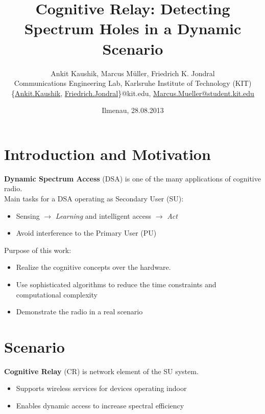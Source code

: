 \documentclass[11pt]{article}
\title{Cognitive Relay: Detecting Spectrum Holes in a Dynamic Scenario}
\date{Ilmenau, 28.08.2013}
\author{Ankit Kaushik, Marcus M\"uller, Friedrich K. Jondral \\
        Communications Engineering Lab, Karlsruhe Institute of Technology (KIT) \\
        \{\href{mailto:Ankit.Kaushik@kit.edu}{Ankit.Kaushik}, 
        \href{mailto:Friedrich.Jondral@kit.edu}{Friedrich.Jondral}\}@kit.edu,
        \href{mailto:Marcus.Mueller@student.kit.edu}{Marcus.Mueller@student.kit.edu} }
\begin{document}
  \maketitle
	\section*{Introduction and Motivation}
	\textbf{Dynamic Spectrum Access} (DSA) is one of the many applications of cognitive radio.\\
	Main tasks for a DSA operating as Secondary User (SU):
	\begin{itemize}
	\item Sensing $\rightarrow$ \textit{Learning} and intelligent access $\rightarrow$ \textit{Act}
	\item Avoid interference to the Primary User (PU)
	\end{itemize}
	
	Purpose of this work:
	\begin{itemize}
	\item Realize the cognitive concepts over the hardware.
	\item Use sophisticated algorithms to reduce the time constraints and computational complexity
	\item Demonstrate the radio in a real scenario
	\end{itemize}
	\section*{Scenario}
		\textbf{Cognitive Relay} (CR) is network element of the SU system.
	\begin{itemize}
	\item Supports wireless services for devices operating indoor
	\item Enables dynamic access to increase spectral efficiency
	\end{itemize}
\end{document}
